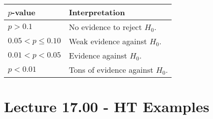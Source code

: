 \begin{enumerate}[(1)]
\begin{table}[!htbp]
\begin{tabularx}{0.7\linewidth}{@{}YY@{}}
                  $ p $-value        & Interpretation                    \\
                  \midrule
                  $ p>0.1 $          & No evidence to reject $ H_0 $.    \\
                  $ 0.05<p\le 0.10 $ & Weak evidence against $ H_0 $.    \\
                  $ 0.01<p<0.05 $    & Evidence against $ H_0 $.         \\
                  $ p<0.01 $         & Tons of evidence against $ H_0 $.
              \end{tabularx}
          \end{table}
\end{enumerate}
\section{Lecture 17.00 - HT Examples}
